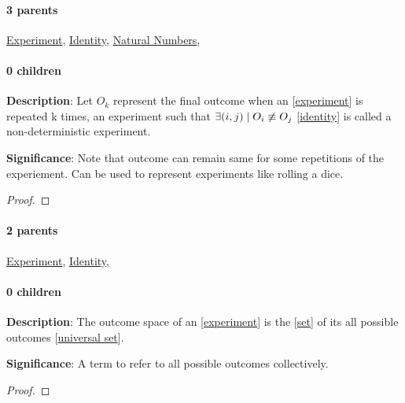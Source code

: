 \documentclass[../main.tex]{subfiles}
\begin{document}
\paragraph{3 parents} \hyperref[statement:Experiment]{Experiment}, \hyperref[statement:Identity]{Identity}, \hyperref[statement:Natural Numbers]{Natural Numbers}, 
\paragraph{0 children} 



\begin{statement}
\label{statement:Non-deterministic Experiment}\hspace*{0pt}\par
\end{statement}
\textbf{Description}:
Let $ O_k $ represent the final outcome when an [\hyperref[statement:Experiment]{experiment}] is repeated k times, an experiment such that $ \exists (i, j) \mid O_i \not\equiv O_j $ [\hyperref[statement:Identity]{identity}] is called a non-deterministic experiment.
\par
{\color{magenta} \textbf{Significance}:
Note that outcome can remain same for some repetitions of the experiement.
Can be used to represent experiments like rolling a dice.
\par}
\begin{proof}
\proofbydefinition
\end{proof}\par
\paragraph{2 parents} \hyperref[statement:Experiment]{Experiment}, \hyperref[statement:Identity]{Identity}, 
\paragraph{0 children} 



\begin{statement}
\label{statement:Outcome Space}\hspace*{0pt}\par
\end{statement}
\textbf{Description}:
The outcome space of an [\hyperref[statement:Experiment]{experiment}] is the [\hyperref[statement:Set]{set}] of its all possible outcomes [\hyperref[statement:Universal Set]{universal set}].
\par
{\color{magenta} \textbf{Significance}:
A term to refer to all possible outcomes collectively.
\par}
\begin{proof}
\proofbydefinition
\end{proof}\par
\end{document}
